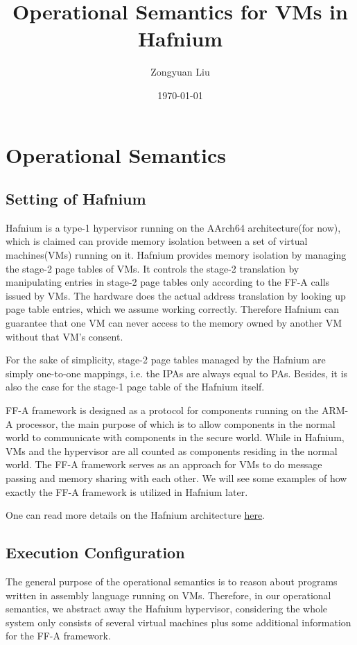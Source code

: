 \documentclass[a4paper]{article}
\title{Operational Semantics %
  for VMs in Hafnium} \date{\today}
\author{Zongyuan Liu}
\begin{document}
\maketitle

\section{Operational Semantics}

\subsection{Setting of Hafnium}
Hafnium is a type-1 hypervisor running on the AArch64 architecture(for now),
which is claimed can provide memory isolation between a set of virtual
machines(VMs) running on it. Hafnium provides memory isolation by managing the
stage-2 page tables of VMs. It controls the stage-2 translation by manipulating
entries in stage-2 page tables only according to the FF-A calls issued by VMs.
The hardware does the actual address translation by looking up page table
entries, which we assume working correctly. Therefore Hafnium can
guarantee that one VM can never access to the memory owned by another VM without
that VM's consent.

For the sake of simplicity, stage-2 page tables managed by the Hafnium are
simply one-to-one mappings, i.e. the IPAs are always equal to PAs. Besides, it
is also the case for the stage-1 page table of the Hafnium itself.

FF-A framework is designed as a protocol for components running on the ARM-A
processor, the main purpose of which is to allow components in the normal world
to communicate with components in the secure world. While in Hafnium, VMs and
the hypervisor are all counted as components residing in the normal world. The
FF-A framework serves as an approach for VMs to do message passing and
memory sharing with each other. We will see some examples of how exactly the
FF-A framework is utilized in Hafnium later.

One can read more details on the Hafnium architecture
\href{https://review.trustedfirmware.org/plugins/gitiles/hafnium/hafnium/+/HEAD/docs/Architecture.md}{here}.

\subsection{Execution Configuration}
 The general purpose of the operational
semantics is to reason about programs written in assembly language running on
VMs. Therefore, in our operational semantics, we abstract away the Hafnium
hypervisor, considering the whole system only consists of several virtual
machines plus some additional information for the FF-A framework.
\end{document}

